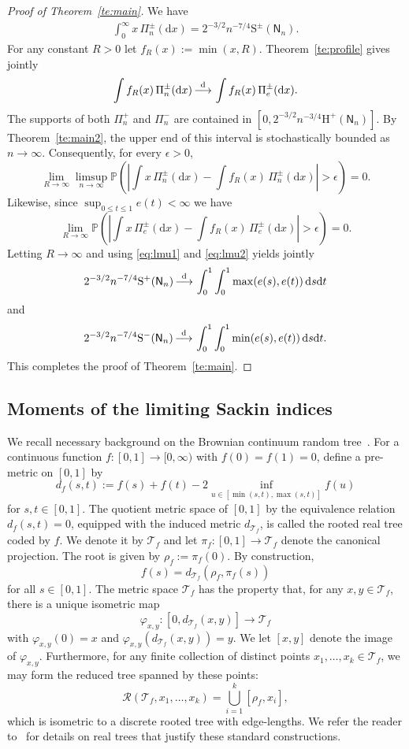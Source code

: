 \documentclass[english,11pt]{smfart}
\newcommand{\Prb}[1]{\mathbb{P}\left(#1\right)}
\newcommand{\convdis}{\,{\buildrel \mathrm{d} \over \longrightarrow}\,}
\newcommand{\He}{\mathrm{H}}
\newcommand{\Si}{\mathrm{S}}
\newcommand{\cR}{\mathcal{R}}
\newcommand{\cT}{\mathcal{T}}
\newcommand{\mN}{\mathsf{N}}
\numberwithin{equation}{section}
\begin{document}
\begin{proof}[Proof of Theorem~\ref{te:main}]
	We have
	\begin{align}
		\label{eq:lmu1}
		\int_0^\infty x\,\Pi_n^\pm(\mathrm{d}x) = 2^{-3/2}n^{-7/4}\Si^\pm(\mN_n).
	\end{align}
	For any constant $R>0$ let $f_R(x) := \min(x,R)$. Theorem~\ref{te:profile} gives jointly
	\begin{align}
		\label{eq:lmu2}
		\int f_R(x)\,\Pi_n^\pm(\mathrm{d}x) \convdis \int f_R(x)\,\Pi_e^\pm(\mathrm{d}x).
	\end{align}
	The supports of both $\Pi_n^+$ and $\Pi_n^-$ are contained in $[0, 2^{-3/2}n^{-3/4}\He^+(\mN_n)]$. By Theorem~\ref{te:main2}, the upper end of this interval is stochastically bounded as $n \to \infty$. Consequently, for every $\epsilon>0$,
	\[
		\lim_{R\to\infty} \limsup_{n\to\infty} \Prb{\left| \int x\,\Pi_n^\pm(\mathrm{d}x) -\int f_R(x)\,\Pi_n^\pm(\mathrm{d}x) \right| > \epsilon} = 0.
	\]
	Likewise, since $\sup_{0\le t\le 1}e(t)<\infty$ we have
	\[
		\lim_{R\to\infty}  \Prb{\left| \int x\,\Pi_e^\pm(\mathrm{d}x) -\int f_R(x)\,\Pi_e^\pm(\mathrm{d}x) \right| > \epsilon} = 0.
	\]
	Letting $R \to \infty$ and using \eqref{eq:lmu1} and \eqref{eq:lmu2} yields jointly
	\[
		2^{-3/2}n^{-7/4}\Si^+(\mN_n) \convdis \int_0^1 \int_0^1\max(e(s),e(t))\,\mathrm{d}s\mathrm{d}t
	\]
	and
	\[
		2^{-3/2}n^{-7/4}\Si^-(\mN_n) \convdis \int_0^1 \int_0^1\min(e(s),e(t))\,\mathrm{d}s\mathrm{d}t.
	\]
	This completes the proof of Theorem~\ref{te:main}.
\end{proof}


\subsection{Moments of the limiting Sackin indices}
\label{sec:sackin-moments}

We recall necessary background on the Brownian continuum random tree~\cite{MR1085326,MR1166406,MR1207226}. For a continuous function $f:[0,1] \to [0,\infty)$ with $f(0)=f(1)=0$, define a pre-metric on $[0,1]$ by
\[
d_f(s,t) := f(s) + f(t) - 2 \inf_{u \in [\min(s,t),\max(s,t)]} f(u)
\]
for $s,t \in [0,1]$. The quotient metric space  of $[0,1]$ by the equivalence relation $d_f(s,t)=0$, equipped with the induced metric $d_{\cT_f}$, is called the rooted real tree coded by $f$.  We denote it by $\cT_f$ and let $\pi_f: [0,1] \to \cT_f$ denote the canonical projection. The root is given by $\rho_f := \pi_f(0)$. By construction,
\[
	f(s) = d_{\cT_f}(\rho_f, \pi_f(s))
\]
for all $s \in [0,1]$. The metric space $\cT_f$ has the property that, for any $x,y \in \cT_f$, there is a unique isometric map
\[
	\varphi_{x,y}: [0, d_{\cT_f}(x,y)] \to \cT_f
\]
with $\varphi_{x,y}(0) = x$ and $\varphi_{x,y}(d_{\cT_f}(x,y)) = y$. We let $[x,y]$ denote the image of $\varphi_{x,y}$. Furthermore, for any finite collection of distinct points $x_1, \ldots, x_k \in \cT_f$, we may form the reduced tree spanned by these points:
\[
	\cR(\cT_f, x_1, \ldots, x_k) = \bigcup_{i=1}^k [\rho_f, x_i],
\]
which is isometric to a discrete  rooted tree with edge-lengths. We refer the reader to~\cite[Ex. 10.6.]{art} for details on real trees that justify these standard constructions.
\end{document}
